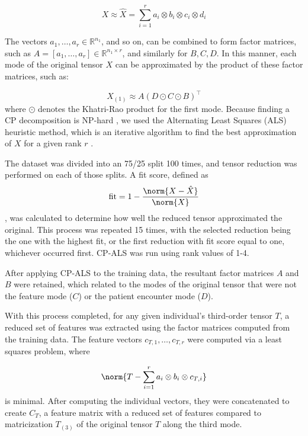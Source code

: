 \begin{equation*}
    X \approx \hat{X} = \sum^{r}_{i=1} a_i \otimes b_i \otimes c_i \otimes d_i
\end{equation*}

The vectors $a_1,\dots,a_r\in\mathbb{R}^{n_1}$, and so on, can be combined to form factor matrices, such as $A = [a_1, \dots, a_r]\in\mathbb{R}^{n_1\times r}$, and similarly for $B, C, D$. In this manner, each mode of the original tensor $X$ can be approximated by the product of these factor matrices, such as:

\begin{equation*}
    X_{(1)} \approx A \left( D \odot C \odot B \right)^{\top}
\end{equation*}
where $\odot$ denotes the Khatri-Rao product for the first mode. Because finding a CP decomposition is NP-hard \autocite{hillar_most_2013}, we used the Alternating Least Squares (ALS) heuristic method, which is an iterative algorithm to find the best approximation of $X$ for a given rank $r$ \autocite{kolda_tensors}.

The dataset was divided into an 75/25 split 100 times, and tensor reduction was performed on each of those splits. A fit score, defined as
\begin{equation*}
    \mathrm{fit} = 1 - \frac{\norm{X - \hat{X}}}{\norm{X}}
\end{equation*}
, was calculated to determine how well the reduced tensor approximated the original. This process was repeated 15 times, with the selected reduction being the one with the highest fit, or the first reduction with fit score equal to one, whichever occurred first. CP-ALS was run using rank values of 1-4.  

After applying CP-ALS to the training data, the resultant factor matrices $A$ and $B$ were retained, which related to the modes of the original tensor that were not the feature mode ($C$) or the patient encounter mode ($D$). 

With this process completed, for any given individual's third-order tensor $T$, a reduced set of features was extracted using the factor matrices computed from the training data. The feature vectors $c_{T,1}, \dots, c_{T,r}$ were computed via a least squares problem, where

\begin{equation*}
    \norm{T - \sum^{r}_{i=1} a_i \otimes b_i \otimes c_{T,i}}
\end{equation*}
is minimal. After computing the individual vectors, they were concatenated to create $C_T$, a feature matrix with a reduced set of features compared to matricization $T_{(3)}$ of the original tensor $T$ along the third mode.

